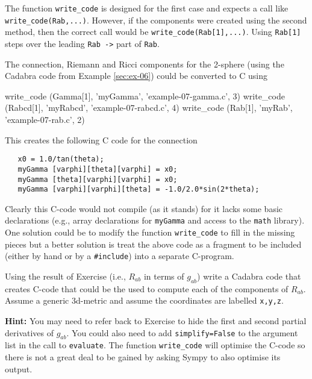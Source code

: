 \documentclass[a4paper,12pt]{article}
\numberwithin{equation}{section}%
\begin{document}
The function \verb|write_code| is designed for the first case and expects a call like
\verb|write_code(Rab,...)|. However, if the components were created using the second method,
then the correct call would be \verb|write_code(Rab[1],...)|. Using \verb|Rab[1]| steps over
the leading \verb|Rab ->| part of \verb|Rab|.

The connection, Riemann and Ricci components for the 2-sphere (using the Cadabra code from
Example \ref{sec:ex-06}) could be converted to C using
\begin{cadabra}[numbers=none]
   write_code (Gamma[1], 'myGamma', 'example-07-gamma.c', 3)
   write_code (Rabcd[1], 'myRabcd', 'example-07-rabcd.c', 4)
   write_code (Rab[1],   'myRab',   'example-07-rab.c',   2)
\end{cadabra}
This creates the following C code for the connection
\bgroup
\lstset{numbers=none,style=myC}
\begin{lstlisting}
   x0 = 1.0/tan(theta);
   myGamma [varphi][theta][varphi] = x0;
   myGamma [theta][varphi][varphi] = x0;
   myGamma [varphi][varphi][theta] = -1.0/2.0*sin(2*theta);
\end{lstlisting}
\egroup
Clearly this C-code would not compile (as it stands) for it lacks some basic declarations
(e.g., array declarations for \verb|myGamma| and access to the \verb|math| library). One
solution could be to modify the function \verb|write_code| to fill in the missing pieces but
a better solution is treat the above code as a fragment to be included (either by hand or by
a \verb|#include|) into a separate C-program.


\begin{Exercises}

   \begin{Exercise}
      Using the result of Exercise  (i.e., $R_{ab}$ in terms of $g_{ab}$)
      write a Cadabra code that creates C-code that could be the used to compute each of the
      components of $R_{ab}$. Assume a generic 3d-metric and assume the coordinates are
      labelled \verb|x,y,z|.

      {\bf Hint:} You may need to refer back to Exercise  to hide the first
                  and second partial derivatives of $g_{ab}$. You could also need to add
                  \verb|simplify=False| to the argument list in the call to \verb|evaluate|.
                  The function \verb|write_code| will optimise the C-code so there is not a
                  great deal to be gained by asking Sympy to also optimise its output.
   \end{Exercise}

\end{Exercises}
\end{document}
